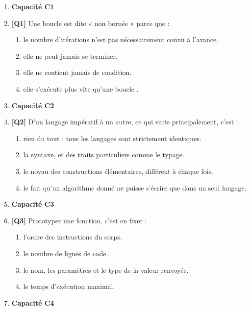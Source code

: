 \begin{enumerate}

\item[] \textbf{Capacité C1}

\item \textbf{[Q1]} Une boucle  est dite « non bornée » parce que :
  \begin{enumerate}[label=\Alph*.]
    \item le nombre d'itérations n'est pas nécessairement connu à l'avance.
    \item elle ne peut jamais se terminer.
    \item elle ne contient jamais de condition.
    \item elle s'exécute plus vite qu'une boucle .
  \end{enumerate}

\item[] \textbf{Capacité C2}

\item \textbf{[Q2]} D'un langage impératif à un autre, ce qui varie principalement, c'est :
  \begin{enumerate}[label=\Alph*.]
    \item rien du tout : tous les langages sont strictement identiques.
    \item la syntaxe, et des traits particuliers comme le typage.
    \item le noyau des constructions élémentaires, différent à chaque fois.
    \item le fait qu'un algorithme donné ne puisse s'écrire que dans un seul langage.
  \end{enumerate}

\item[] \textbf{Capacité C3}

\item \textbf{[Q3]} Prototyper une fonction, c'est en fixer :
  \begin{enumerate}[label=\Alph*.]
    \item l'ordre des instructions du corps.
    \item le nombre de lignes de code.
    \item le nom, les paramètres et le type de la valeur renvoyée.
    \item le temps d'exécution maximal.
  \end{enumerate}

\item[] \textbf{Capacité C4}


\end{enumerate}
